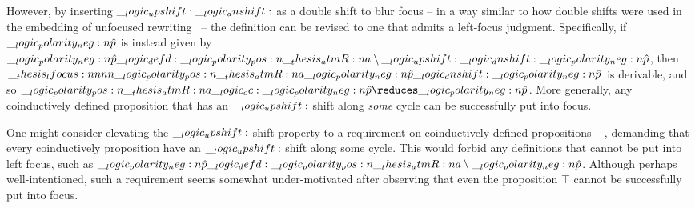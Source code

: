 However, by inserting $\__logic_upshift: \__logic_dnshift:$ as a double shift to blur focus -- in a way similar to how double shifts were used in the embedding of unfocused rewriting~ -- the definition can be revised to one that admits a left-focus judgment.
Specifically, if $\__logic_polarity_neg:n {\hat{p}}$ is instead given by $\__logic_polarity_neg:n {\hat{p}} \__logic_defd: \__logic_polarity_pos:n {\__thesis_atmR:n {a}} \mathbin { \setminus } \__logic_upshift: \__logic_dnshift: \__logic_polarity_neg:n {\hat{p}}$, then $\__thesis_lfocus:nnnn {\__logic_polarity_pos:n {\__thesis_atmR:n {a}}} {\__logic_polarity_neg:n {\hat{p}}} {} {\__logic_dnshift: \__logic_polarity_neg:n {\hat{p}}}$ is derivable, and so $\p{\atmR{a}} \oc \n{\defp{p}} \reduces \n{\defp{p}}$.
More generally, any coinductively defined proposition that has an $\__logic_upshift:$ shift along \emph{some} cycle can be successfully put into focus.

One might consider elevating the $\__logic_upshift:$-shift property to a requirement on coinductively defined propositions -- \ie, demanding that every coinductively proposition have an $\__logic_upshift:$ shift along some cycle.
This would forbid any definitions that cannot be put into left focus, such as $\__logic_polarity_neg:n {\hat{p}} \__logic_defd: \__logic_polarity_pos:n {\__thesis_atmR:n {a}} \mathbin { \setminus } \__logic_polarity_neg:n {\hat{p}}$.
Although perhaps well-intentioned, such a requirement seems somewhat under-motivated after observing that even the proposition $\top$ cannot be successfully put into focus.







